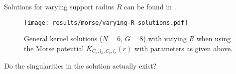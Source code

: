 Solutions for varying support radius $R$ can be found in .

\begin{figure}[H]
  \centering
  \texttt{[image: results/morse/varying-R-solutions.pdf]}
  \caption[Solutions with varying $R$]{General kernel solutions ($N = 6$, $G = 8$) with varying $R$ when using the Morse potential $K_{C_a, l_a, C_r, l_r}(r)$ with parameters as given above.}
  \label{fig:varying-R-solutions}
\end{figure}

Do the singularities in the solution actually exist?
